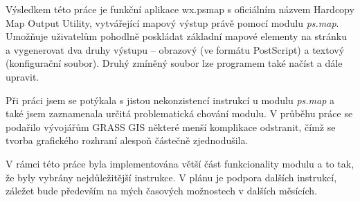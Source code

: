 \documentclass[a4paper,12pt,draft]{article}
\newcommand{\modul}[1]{\emph{#1}}
\begin{document}
Výsledkem této práce je funkční aplikace wx.psmap s oficiálním názvem Hardcopy
Map Output Utility, vytvářející mapový výstup právě pomocí modulu
\modul{ps.map}. Umožňuje uživatelům pohodlně poskládat
základní mapové elementy na stránku a vygenerovat dva druhy výstupu -- obrazový
(ve formátu PostScript) a textový (konfigurační soubor). Druhý zmíněný soubor
lze programem také načíst a dále upravit.

Při práci jsem se potýkala s jistou nekonzistencí instrukcí u modulu
\modul{ps.map} a také jsem zaznamenala určitá problematická chování modulu. V
průběhu práce se podařilo vývojářům GRASS GIS některé menší komplikace
odstranit, čímž se tvorba grafického rozhraní alespoň částečně zjednodušila.


V rámci této práce byla implementována větší část funkcionality modulu a to
tak, že byly vybrány nejdůležitější instrukce. V plánu je podpora dalších
instrukcí, záležet bude především na mých časových možnostech v dalších
měsících.
\end{document}
